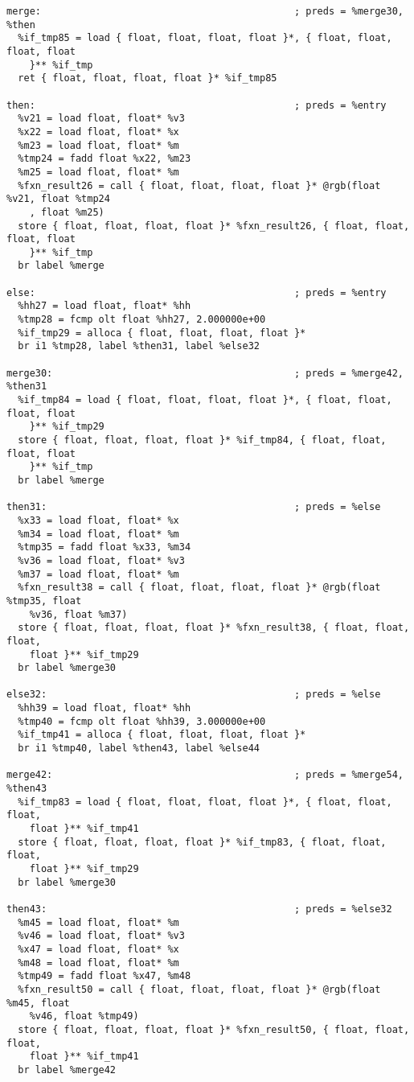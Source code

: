 \documentclass[main.tex]{subfiles}
\begin{document}
{\begin{lstlisting}
merge:                                            ; preds = %merge30, %then
  %if_tmp85 = load { float, float, float, float }*, { float, float, float, float
    }** %if_tmp
  ret { float, float, float, float }* %if_tmp85

then:                                             ; preds = %entry
  %v21 = load float, float* %v3
  %x22 = load float, float* %x
  %m23 = load float, float* %m
  %tmp24 = fadd float %x22, %m23
  %m25 = load float, float* %m
  %fxn_result26 = call { float, float, float, float }* @rgb(float %v21, float %tmp24
    , float %m25)
  store { float, float, float, float }* %fxn_result26, { float, float, float, float
    }** %if_tmp
  br label %merge

else:                                             ; preds = %entry
  %hh27 = load float, float* %hh
  %tmp28 = fcmp olt float %hh27, 2.000000e+00
  %if_tmp29 = alloca { float, float, float, float }*
  br i1 %tmp28, label %then31, label %else32

merge30:                                          ; preds = %merge42, %then31
  %if_tmp84 = load { float, float, float, float }*, { float, float, float, float
    }** %if_tmp29
  store { float, float, float, float }* %if_tmp84, { float, float, float, float
    }** %if_tmp
  br label %merge

then31:                                           ; preds = %else
  %x33 = load float, float* %x
  %m34 = load float, float* %m
  %tmp35 = fadd float %x33, %m34
  %v36 = load float, float* %v3
  %m37 = load float, float* %m
  %fxn_result38 = call { float, float, float, float }* @rgb(float %tmp35, float
    %v36, float %m37)
  store { float, float, float, float }* %fxn_result38, { float, float, float,
    float }** %if_tmp29
  br label %merge30

else32:                                           ; preds = %else
  %hh39 = load float, float* %hh
  %tmp40 = fcmp olt float %hh39, 3.000000e+00
  %if_tmp41 = alloca { float, float, float, float }*
  br i1 %tmp40, label %then43, label %else44

merge42:                                          ; preds = %merge54, %then43
  %if_tmp83 = load { float, float, float, float }*, { float, float, float,
    float }** %if_tmp41
  store { float, float, float, float }* %if_tmp83, { float, float, float,
    float }** %if_tmp29
  br label %merge30

then43:                                           ; preds = %else32
  %m45 = load float, float* %m
  %v46 = load float, float* %v3
  %x47 = load float, float* %x
  %m48 = load float, float* %m
  %tmp49 = fadd float %x47, %m48
  %fxn_result50 = call { float, float, float, float }* @rgb(float %m45, float
    %v46, float %tmp49)
  store { float, float, float, float }* %fxn_result50, { float, float, float,
    float }** %if_tmp41
  br label %merge42


\end{lstlisting}}
\end{document}

